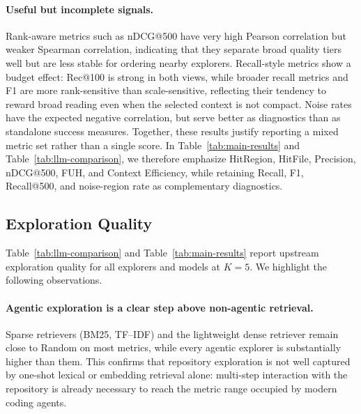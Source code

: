 \paragraph{Useful but incomplete signals.}
Rank-aware metrics such as nDCG@500 have very high Pearson correlation but weaker Spearman correlation, indicating that they separate broad quality tiers well but are less stable for ordering nearby explorers. Recall-style metrics show a budget effect: Rec@100 is strong in both views, while broader recall metrics and F1 are more rank-sensitive than scale-sensitive, reflecting their tendency to reward broad reading even when the selected context is not compact. Noise rates have the expected negative correlation, but serve better as diagnostics than as standalone success measures. Together, these results justify reporting a mixed metric set rather than a single score. In Table~\ref{tab:main-results} and Table~\ref{tab:llm-comparison}, we therefore emphasize HitRegion, HitFile, Precision, nDCG@500, FUH, and Context Efficiency, while retaining Recall, F1, Recall@500, and noise-region rate as complementary diagnostics.




























 
\subsection{Exploration Quality}
\label{sec:main-results}
 
Table~\ref{tab:llm-comparison} and Table~\ref{tab:main-results} report upstream exploration quality for all explorers and models at $K{=}5$. We highlight the following observations.

 
\paragraph{Agentic exploration is a clear step above non-agentic retrieval.}
Sparse retrievers (BM25, TF--IDF) and the lightweight dense retriever remain close to Random on most metrics, while every agentic explorer is substantially higher than them. This confirms that repository exploration is not well captured by one-shot lexical or embedding retrieval alone: multi-step interaction with the repository is already necessary to reach the metric range occupied by modern coding agents.
 
